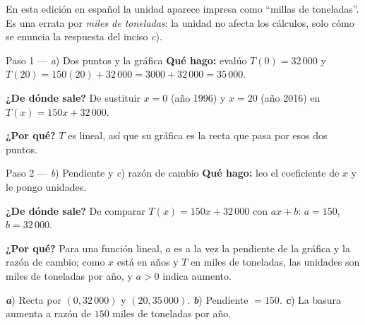 \documentclass[11pt]{article}
\begin{document}
\begin{nota}
En esta edición en español la unidad aparece impresa como ``millas de toneladas''. Es una errata por \emph{miles de toneladas}: la unidad no afecta los cálculos, solo cómo se enuncia la respuesta del inciso \textit{c}).
\end{nota}

\begin{paso}{Paso 1 --- \textit{a}) Dos puntos y la gráfica}
\textbf{Qué hago:} evalúo $T(0)=32\,000$ y $T(20)=150(20)+32\,000=3000+32\,000=35\,000$.

\textbf{¿De dónde sale?} De sustituir $x=0$ (año 1996) y $x=20$ (año 2016) en $T(x)=150x+32\,000$.

\textbf{¿Por qué?} $T$ es lineal, así que su gráfica es la recta que pasa por esos dos puntos.
\begin{center}
\end{center}
\end{paso}

\begin{paso}{Paso 2 --- \textit{b}) Pendiente y \textit{c}) razón de cambio}
\textbf{Qué hago:} leo el coeficiente de $x$ y le pongo unidades.

\textbf{¿De dónde sale?} De comparar $T(x)=150x+32\,000$ con $ax+b$: $a=150$, $b=32\,000$.

\textbf{¿Por qué?} Para una función lineal, $a$ es a la vez la pendiente de la gráfica y la razón de cambio; como $x$ está en años y $T$ en miles de toneladas, las unidades son miles de toneladas por año, y $a>0$ indica aumento.
\end{paso}

\begin{resp}
\textbf{\textit{a}}) Recta por $(0,32\,000)$ y $(20,35\,000)$. \quad \textbf{\textit{b}}) Pendiente $=150$. \quad \textbf{\textit{c}}) La basura aumenta a razón de $150$ miles de toneladas por año.
\end{resp}
\end{document}
